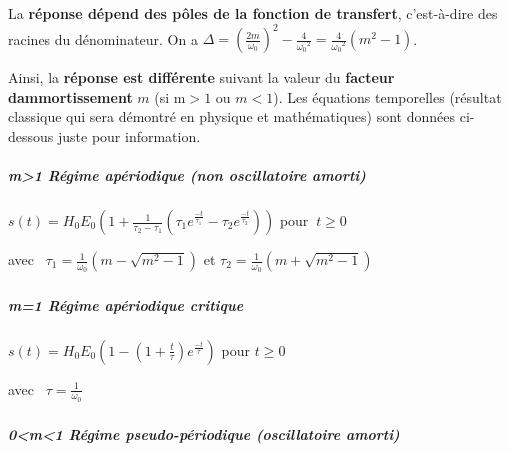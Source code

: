 La \textbf{réponse dépend des pôles de la fonction de transfert}, c'est-à-dire des racines du dénominateur. On a \(\Delta = \left( \frac{2m}{\omega_{0}} \right)^{2} - \frac{4}{{\omega_{0}}^{2}} = \frac{4}{{\omega_{0}}^{2}}\left( m^{2} - 1 \right)\).

Ainsi, la \textbf{réponse est différente} suivant la valeur du \textbf{facteur d\textquotesingle ammortissement} \(m\) (si m\(> 1\) ou \(m < 1\)). Les équations temporelles (résultat classique qui sera démontré en physique et mathématiques) sont données ci-dessous juste pour information.

\hypertarget{mod-m1-ruxe9gime-apuxe9riodique-non-oscillatoire-amorti}{%
\subparagraph*{\texorpdfstring{ m\textgreater1 Régime apériodique (non oscillatoire amorti)}{ m\textgreater1 Régime apériodique (non oscillatoire amorti)}}\label{mod-m1-ruxe9gime-apuxe9riodique-non-oscillatoire-amorti}}

\(s(t) = H_{0}E_{0}\left( 1 + \frac{1}{\tau_{2} - \tau_{1}}\left( \tau_{1}e^{\frac{- t}{\tau_{1}}} - \tau_{2}e^{\frac{- t}{\tau_{2}}} \right) \right)\) pour \(\ t \geq 0\)

avec~ \(\tau_{1} = \frac{1}{\omega_{0}}\left( m - \sqrt{m^{2} - 1} \right)\) et \(\tau_{2} = \frac{1}{\omega_{0}}\left( m + \sqrt{m^{2} - 1} \right)\)

\hypertarget{mod-section-2}{%
\subparagraph*{\texorpdfstring{ }{ }}\label{mod-section-2}}

\hypertarget{mod-m1-ruxe9gime-apuxe9riodique-critique}{%
\subparagraph*{m=1 Régime apériodique critique}\label{mod-m1-ruxe9gime-apuxe9riodique-critique}}

\(s(t) = H_{0}E_{0}\left( 1 - \left( 1 + \frac{t}{\tau} \right)e^{\frac{- t}{\tau}} \right)\) pour \(t \geq 0\)

avec~ \(\tau = \frac{1}{\omega_{0}}\)

\hypertarget{mod-section-3}{%
\subparagraph*{}\label{mod-section-3}}

\hypertarget{mod-m1-ruxe9gime-pseudo-puxe9riodique-oscillatoire-amorti}{%
\subparagraph*{\texorpdfstring{0\textless m\textless1 Régime pseudo-périodique (oscillatoire amorti)}{0\textless m\textless1 Régime pseudo-périodique (oscillatoire amorti)}}\label{mod-m1-ruxe9gime-pseudo-puxe9riodique-oscillatoire-amorti}}

